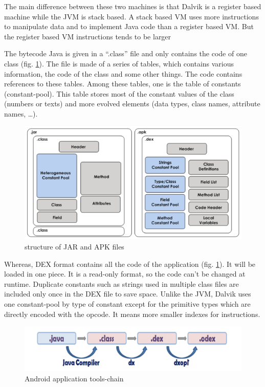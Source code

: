 \documentclass{sigplanconf}
\def \DALVIK{\mbox{Dalvik}\xspace}
\def \ANDROID{\mbox{Android}\xspace}
\def \JVM{JVM\xspace}
\def \DEX{\mbox{DEX}\xspace}
\begin{document}
      The main difference between these two machines is that \DALVIK is a register based machine while the \JVM is stack based.
      A stack based VM uses more instructions to manipulate data and to implement Java code than a register based VM.
      But the register based VM instructions tends to be larger \cite{ieee-paul-kundu-energy-perspective}

      The bytecode Java is given in a ``.class'' file and only contains the code of one class (fig. \ref{SJA}).
      The file is made of a series of tables, which contains various information, the code of the class and some other things.
      The code contains references to these tables.
      Among these tables, one is the table of constants (constant-pool).
      This table stores most of the constant values of the class (numbers or texts)
      and more evolved elements (data types, class names, attribute names, \dots).

      \begin{figure}[h]
        \centering \includegraphics[width=\columnwidth]{structure-jar-apk.png}
        \caption{structure of JAR and APK files}
        \label{SJA}
      \end{figure}

      Whereas, \DEX format contains all the code of the application (fig. \ref{SJA}).
      It will be loaded in one piece.
      It is a read-only format, so the code can't be changed at runtime.
      Duplicate constants such as strings used in multiple class files
      are included only once in the \DEX file to save space.
      Unlike the \JVM, \DALVIK uses one constant-pool by type of constant
      except for the primitive types which are directly encoded with the opcode.
      It means more smaller indexes for instructions.\\

      \begin{figure}[t]
        \centering \includegraphics[width=\columnwidth]{dex-tools-chain.png}
        \caption{\ANDROID application tools-chain}
        \label{DTC}
      \end{figure}
\end{document}
